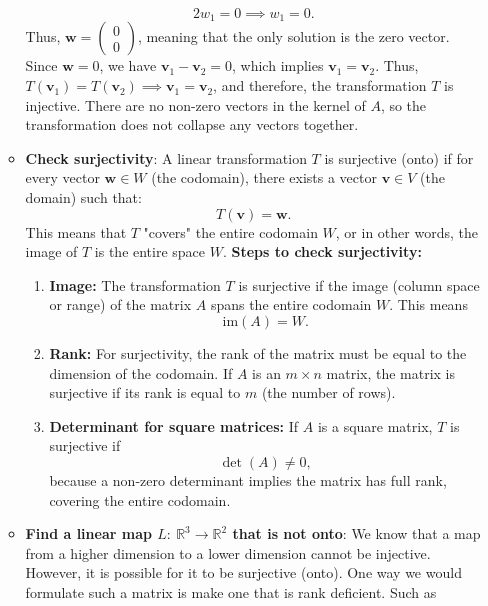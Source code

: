 \documentclass{report}
\begin{document}
\begin{itemize}
\begin{itemize}
                \[
                    2w_1 = 0 \implies w_1 = 0.
                \]
                Thus, \( \mathbf{w} = \begin{pmatrix} 0 \\ 0 \end{pmatrix} \), meaning that the only solution is the zero vector.
                \bigbreak \noindent 
                Since \( \mathbf{w} = 0 \), we have \( \mathbf{v}_1 - \mathbf{v}_2 = 0 \), which implies \( \mathbf{v}_1 = \mathbf{v}_2 \).
                \bigbreak \noindent 
                Thus, \( T(\mathbf{v}_1) = T(\mathbf{v}_2) \implies \mathbf{v}_1 = \mathbf{v}_2 \), and therefore, the transformation \( T \) is injective. There are no non-zero vectors in the kernel of \( A \), so the transformation does not collapse any vectors together.
            \item \textbf{Check surjectivity}:
                A linear transformation \( T \) is surjective (onto) if for every vector \( \mathbf{w} \in W \) (the codomain), there exists a vector \( \mathbf{v} \in V \) (the domain) such that:
                \[
                    T(\mathbf{v}) = \mathbf{w}.
                \]
                This means that \( T \) "covers" the entire codomain \( W \), or in other words, the image of \( T \) is the entire space \( W \).
                \bigbreak \noindent 
                \textbf{Steps to check surjectivity:}
                \begin{enumerate}
                    \item \textbf{Image:} The transformation \( T \) is surjective if the image (column space or range) of the matrix \( A \) spans the entire codomain \( W \). This means 
                    \[
                        \text{im}(A) = W.
                    \]
                    \item \textbf{Rank:} For surjectivity, the rank of the matrix must be equal to the dimension of the codomain. If \( A \) is an \( m \times n \) matrix, the matrix is surjective if its rank is equal to \( m \) (the number of rows).
                    \item \textbf{Determinant for square matrices:} If \( A \) is a square matrix, \( T \) is surjective if 
                    \[
                        \det(A) \neq 0,
                    \]
                    because a non-zero determinant implies the matrix has full rank, covering the entire codomain.
                \end{enumerate}
            \item \textbf{Find a linear map $L:\ \mathbb{R}^{3} \to \mathbb{R}^{2}$ that is not onto}: We know that a map from a higher dimension to a lower dimension cannot be injective. However, it is possible for it to be surjective (onto). One way we would formulate such a matrix is make one that is rank deficient. Such as

\end{itemize}
\end{itemize}
\end{document}
